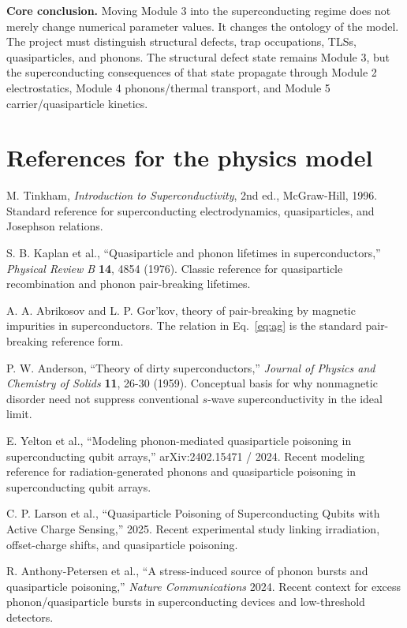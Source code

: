 \documentclass[11pt]{article}
\begin{document}
\begin{physicsbox}
\textbf{Core conclusion.} Moving Module 3 into the superconducting regime does not merely change numerical parameter values. It changes the ontology of the model. The project must distinguish structural defects, trap occupations, TLSs, quasiparticles, and phonons. The structural defect state remains Module 3, but the superconducting consequences of that state propagate through Module 2 electrostatics, Module 4 phonons/thermal transport, and Module 5 carrier/quasiparticle kinetics.
\end{physicsbox}

\section{References for the physics model}

\begin{enumerate}[label={[\arabic*]}]
\item M. Tinkham, \textit{Introduction to Superconductivity}, 2nd ed., McGraw-Hill, 1996. Standard reference for superconducting electrodynamics, quasiparticles, and Josephson relations.
\item S. B. Kaplan et al., ``Quasiparticle and phonon lifetimes in superconductors,'' \textit{Physical Review B} \textbf{14}, 4854 (1976). Classic reference for quasiparticle recombination and phonon pair-breaking lifetimes.
\item A. A. Abrikosov and L. P. Gor'kov, theory of pair-breaking by magnetic impurities in superconductors. The relation in Eq.~\eqref{eq:ag} is the standard pair-breaking reference form.
\item P. W. Anderson, ``Theory of dirty superconductors,'' \textit{Journal of Physics and Chemistry of Solids} \textbf{11}, 26-30 (1959). Conceptual basis for why nonmagnetic disorder need not suppress conventional $s$-wave superconductivity in the ideal limit.
\item E. Yelton et al., ``Modeling phonon-mediated quasiparticle poisoning in superconducting qubit arrays,'' arXiv:2402.15471 / 2024. Recent modeling reference for radiation-generated phonons and quasiparticle poisoning in superconducting qubit arrays.
\item C. P. Larson et al., ``Quasiparticle Poisoning of Superconducting Qubits with Active Charge Sensing,'' 2025. Recent experimental study linking irradiation, offset-charge shifts, and quasiparticle poisoning.
\item R. Anthony-Petersen et al., ``A stress-induced source of phonon bursts and quasiparticle poisoning,'' \textit{Nature Communications} 2024. Recent context for excess phonon/quasiparticle bursts in superconducting devices and low-threshold detectors.
\end{enumerate}
\end{document}
